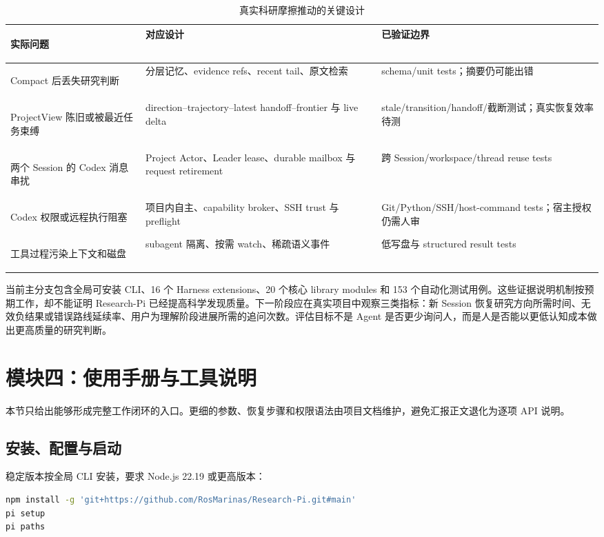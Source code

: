 \documentclass[UTF8,11pt,a4paper,fontset=fandol]{ctexart}
\begin{document}
\begin{table}[H]
  \centering
  \caption{真实科研摩擦推动的关键设计}
  \small
  \setlength{\tabcolsep}{4pt}
  \begin{tabularx}{\textwidth}{>{\bfseries\raggedright\arraybackslash}p{3cm}YY}
    \toprule
    实际问题 & 对应设计 & 已验证边界 \\
    \midrule
    Compact 后丢失研究判断 & 分层记忆、evidence refs、recent tail、原文检索 & schema/unit tests；摘要仍可能出错 \\
    ProjectView 陈旧或被最近任务束缚 & direction--trajectory--latest handoff--frontier 与 live delta & stale/transition/handoff/截断测试；真实恢复效率待测 \\
    两个 Session 的 Codex 消息串扰 & Project Actor、Leader lease、durable mailbox 与 request retirement & 跨 Session/workspace/thread reuse tests \\
    Codex 权限或远程执行阻塞 & 项目内自主、capability broker、SSH trust 与 preflight & Git/Python/SSH/host-command tests；宿主授权仍需人审 \\
    工具过程污染上下文和磁盘 & subagent 隔离、按需 watch、稀疏语义事件 & 低写盘与 structured result tests \\
    \bottomrule
  \end{tabularx}
\end{table}

当前主分支包含全局可安装 CLI、16 个 Harness extensions、20 个核心 library modules 和 153 个自动化测试用例。这些证据说明机制按预期工作，却不能证明 Research-Pi 已经提高科学发现质量。下一阶段应在真实项目中观察三类指标：新 Session 恢复研究方向所需时间、无效负结果或错误路线延续率、用户为理解阶段进展所需的追问次数。评估目标不是 Agent 是否更少询问人，而是人是否能以更低认知成本做出更高质量的研究判断。

\section{模块四：使用手册与工具说明}

本节只给出能够形成完整工作闭环的入口。更细的参数、恢复步骤和权限语法由项目文档维护，避免汇报正文退化为逐项 API 说明。

\subsection{安装、配置与启动}

稳定版本按全局 CLI 安装，要求 Node.js 22.19 或更高版本：

\begin{lstlisting}[language=bash]
npm install -g 'git+https://github.com/RosMarinas/Research-Pi.git#main'
pi setup
pi paths
\end{lstlisting}
\end{document}
